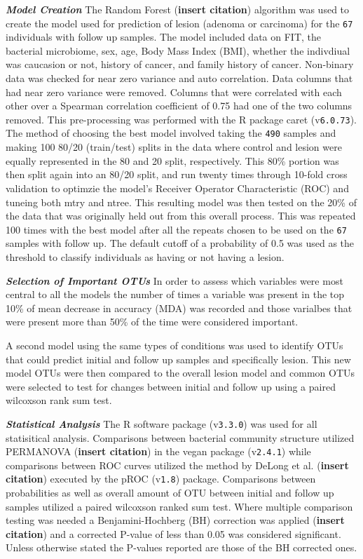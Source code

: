 \documentclass[12pt,]{article}
\begin{document}
\textbf{\emph{Model Creation}} The Random Forest (\textbf{insert
citation}) algorithm was used to create the model used for prediction of
lesion (adenoma or carcinoma) for the \texttt{67} individuals with
follow up samples. The model included data on FIT, the bacterial
microbiome, sex, age, Body Mass Index (BMI), whether the indivdiual was
caucasion or not, history of cancer, and family history of cancer.
Non-binary data was checked for near zero variance and auto correlation.
Data columns that had near zero variance were removed. Columns that were
correlated with each other over a Spearman correlation coefficient of
0.75 had one of the two columns removed. This pre-processing was
performed with the R package caret (v\texttt{6.0.73}). The method of
choosing the best model involved taking the \texttt{490} samples and
making 100 80/20 (train/test) splits in the data where control and
lesion were equally represented in the 80 and 20 split, respectively.
This 80\% portion was then split again into an 80/20 split, and run
twenty times through 10-fold cross validation to optimzie the model's
Receiver Operator Characteristic (ROC) and tuneing both mtry and ntree.
This resulting model was then tested on the 20\% of the data that was
originally held out from this overall process. This was repeated 100
times with the best model after all the repeats chosen to be used on the
\texttt{67} samples with follow up. The default cutoff of a probability
of 0.5 was used as the threshold to classify individuals as having or
not having a lesion.

\textbf{\emph{Selection of Important OTUs}} In order to assess which
variables were most central to all the models the number of times a
variable was present in the top 10\% of mean decrease in accuracy (MDA)
was recorded and those varialbes that were present more than 50\% of the
time were considered important.

A second model using the same types of conditions was used to identify
OTUs that could predict initial and follow up samples and specifically
lesion. This new model OTUs were then compared to the overall lesion
model and common OTUs were selected to test for changes between initial
and follow up using a paired wilcoxson rank sum test.

\textbf{\emph{Statistical Analysis}} The R software package
(v\texttt{3.3.0}) was used for all statisitical analysis. Comparisons
between bacterial community structure utilized PERMANOVA (\textbf{insert
citation}) in the vegan package (v\texttt{2.4.1}) while comparisons
between ROC curves utilized the method by DeLong et al. (\textbf{insert
citation}) executed by the pROC (v\texttt{1.8}) package. Comparisons
between probabilities as well as overall amount of OTU between initial
and follow up samples utilized a paired wilcoxson ranked sum test. Where
multiple comparison testing was needed a Benjamini-Hochberg (BH)
correction was applied (\textbf{insert citation}) and a corrected
P-value of less than 0.05 was considered significant. Unless otherwise
stated the P-values reported are those of the BH corrected ones.
\end{document}
